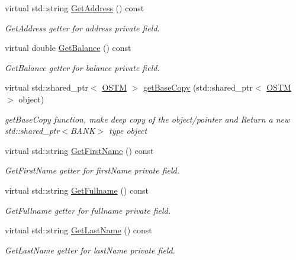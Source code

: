 \begin{DoxyCompactItemize}
virtual std\+::string \hyperlink{class_a_i_b_a5092c8741fbe231531aa5aaa61d26b9c_a5092c8741fbe231531aa5aaa61d26b9c}{Get\+Address} () const 
\begin{DoxyCompactList}\small\item\em Get\+Address getter for address private field. \end{DoxyCompactList}\item 
virtual double \hyperlink{class_a_i_b_ac75087ae73c308bd946e47a71dc85b86_ac75087ae73c308bd946e47a71dc85b86}{Get\+Balance} () const 
\begin{DoxyCompactList}\small\item\em Get\+Balance getter for balance private field. \end{DoxyCompactList}\item 
virtual std\+::shared\+\_\+ptr$<$ \hyperlink{class_o_s_t_m}{O\+S\+TM} $>$ \hyperlink{class_a_i_b_a987107f3d7a04790f84c1e7eeee37575_a987107f3d7a04790f84c1e7eeee37575}{get\+Base\+Copy} (std\+::shared\+\_\+ptr$<$ \hyperlink{class_o_s_t_m}{O\+S\+TM} $>$ object)
\begin{DoxyCompactList}\small\item\em get\+Base\+Copy function, make deep copy of the object/pointer and Return a new std\+::shared\+\_\+ptr$<$\+B\+A\+N\+K$>$ type object \end{DoxyCompactList}\item 
virtual std\+::string \hyperlink{class_a_i_b_aa0833919c1c211481560cd88cb5b381b_aa0833919c1c211481560cd88cb5b381b}{Get\+First\+Name} () const 
\begin{DoxyCompactList}\small\item\em Get\+First\+Name getter for first\+Name private field. \end{DoxyCompactList}\item 
virtual std\+::string \hyperlink{class_a_i_b_a4fbad1d62d84d47e78b2b7065be14942_a4fbad1d62d84d47e78b2b7065be14942}{Get\+Fullname} () const 
\begin{DoxyCompactList}\small\item\em Get\+Fullname getter for fullname private field. \end{DoxyCompactList}\item 
virtual std\+::string \hyperlink{class_a_i_b_a1b09db7268734beeaf6a9e7e9d8feb02_a1b09db7268734beeaf6a9e7e9d8feb02}{Get\+Last\+Name} () const 
\begin{DoxyCompactList}\small\item\em Get\+Last\+Name getter for last\+Name private field. \end{DoxyCompactList}\item 

\end{DoxyCompactItemize}
